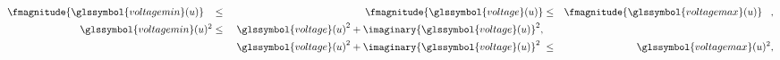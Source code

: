 \begin{alignat}{3}
        \fmagnitude{\glssymbol{voltagemin}(\vertexa)}\hphantom{)^2}
    &\leq
        &\fmagnitude{\glssymbol{voltage}(\vertexa)}
    &\leq&
        \fmagnitude{\glssymbol{voltagemax}(\vertexa)}\hphantom{)^2},
    \label{ch:foundations:sec:power-flow-analyses:eq:network:bounds:voltage-magnitude-min:polar}
    \\
        \glssymbol{voltagemin}(\vertexa)^2
    &\leq
        &\,\,\real{\glssymbol{voltage}(\vertexa)}^2
    +
        \imaginary{\glssymbol{voltage}(\vertexa)}^2,&&
    \label{ch:foundations:sec:power-flow-analyses:eq:network:bounds:voltage-magnitude-min:rectangular}
    \\
        &&\real{\glssymbol{voltage}(\vertexa)}^2 
    + 
        \imaginary{\glssymbol{voltage}(\vertexa)}^2\hphantom{,}
    &\leq&
        \glssymbol{voltagemax}(\vertexa)^2,
    \label{ch:foundations:sec:power-flow-analyses:eq:network:bounds:voltage-magnitude-max:rectangular}
\end{alignat}